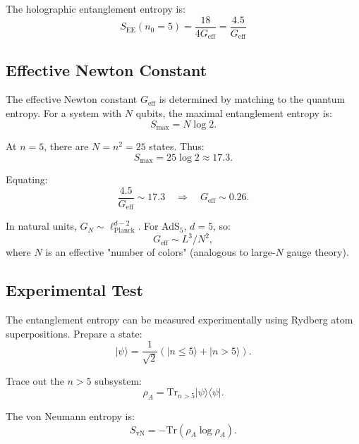 \documentclass[aps,prd,twocolumn,superscriptaddress,floatfix]{revtex4-2}
\begin{document}
The holographic entanglement entropy is:
\begin{equation}
\boxed{S_{\text{EE}}(n_0=5) = \frac{18}{4G_{\text{eff}}} = \frac{4.5}{G_{\text{eff}}}}
\end{equation}

\subsection{Effective Newton Constant}

The effective Newton constant $G_{\text{eff}}$ is determined by matching to the quantum entropy. For a system with $N$ qubits, the maximal entanglement entropy is:
\begin{equation}
S_{\text{max}} = N \log 2.
\end{equation}

At $n=5$, there are $N = n^2 = 25$ states. Thus:
\begin{equation}
S_{\text{max}} = 25 \log 2 \approx 17.3.
\end{equation}

Equating:
\begin{equation}
\frac{4.5}{G_{\text{eff}}} \sim 17.3 \quad \Rightarrow \quad G_{\text{eff}} \sim 0.26.
\end{equation}

In natural units, $G_N \sim \ell_{\text{Planck}}^{d-2}$. For AdS$_5$, $d=5$, so:
\begin{equation}
G_{\text{eff}} \sim L^3 / N^2,
\end{equation}
where $N$ is an effective "number of colors" (analogous to large-$N$ gauge theory).

\subsection{Experimental Test}

The entanglement entropy can be measured experimentally using Rydberg atom superpositions. Prepare a state:
\begin{equation}
|\psi\rangle = \frac{1}{\sqrt{2}}\left( |n \leq 5\rangle + |n > 5\rangle \right).
\end{equation}

Trace out the $n > 5$ subsystem:
\begin{equation}
\rho_A = \text{Tr}_{n>5} |\psi\rangle\langle\psi|.
\end{equation}

The von Neumann entropy is:
\begin{equation}
S_{\text{vN}} = -\text{Tr}(\rho_A \log \rho_A).
\end{equation}
\end{document}
